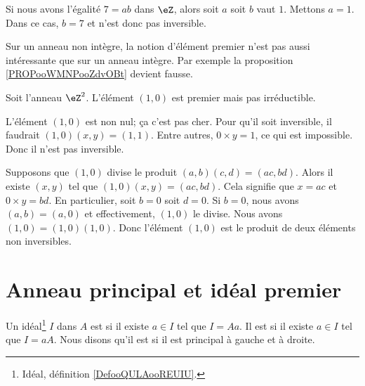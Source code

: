 \begin{example}
	Si nous avons l'égalité \( 7=ab\) dans \( \eZ\), alors soit \( a\) soit \( b\) vaut \( 1\). Mettons \( a=1\). Dans ce cas, \( b=7\) et n'est donc pas inversible.
\end{example}

Sur un anneau non intègre, la notion d'élément premier n'est pas aussi intéressante que sur un anneau intègre. Par exemple la proposition \ref{PROPooWMNPooZdvOBt} devient fausse.

\begin{example}     \label{EXooEIUEooCZCPMC}
	Soit l'anneau \( \eZ^2\). L'élément \( (1,0)\) est premier mais pas irréductible.
	\begin{subproof}
		L'élément \( (1,0)\) est non nul; ça c'est pas cher. Pour qu'il soit inversible, il faudrait \( (1,0)(x,y)=(1,1)\). Entre autres, \( 0\times y=1\), ce qui est impossible. Donc il n'est pas inversible.

		Supposons que \( (1,0)\) divise le produit \( (a,b)(c,d)=(ac,bd)\). Alors il existe \( (x,y)\) tel que \( (1,0)(x,y)=(ac,bd)\). Cela signifie que \( x=ac\) et \( 0\times y=bd\). En particulier, soit \( b=0\) soit \( d=0\). Si \( b=0\), nous avons \( (a,b)=(a,0)\) et effectivement, \( (1,0)\) le divise.
		Nous avons \( (1,0)=(1,0)(1,0)\). Donc l'élément \( (1,0)\) est le produit de deux éléments non inversibles.
	\end{subproof}
\end{example}

\section{Anneau principal et idéal premier}

\begin{definition}      \label{DEFooMZRKooBPLAWH}
	Un idéal\footnote{Idéal, définition \ref{DefooQULAooREUIU}.} \( I\) dans \( A\) est  si il existe \( a\in I\) tel que \( I= A a\). Il est  si il existe \( a\in I\) tel que \( I=a A\). Nous disons qu'il est  si il est principal à gauche et à droite.
\end{definition}


